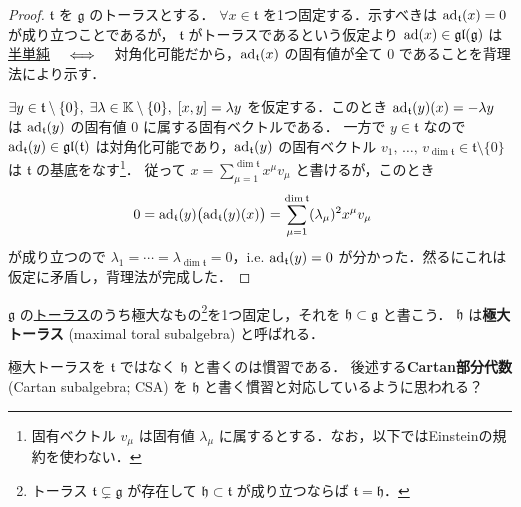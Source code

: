 \documentclass[rep_main]{subfiles}
\begin{document}
\begin{proof}
	$\mathfrak{t}$ を $\mathfrak{g}$ のトーラスとする．
	$\forall x \in \mathfrak{t}$ を1つ固定する．示すべきは $\operatorname{ad}_{\mathfrak{t}} (x) = 0$ が成り立つことであるが，
	$\mathfrak{t}$ がトーラスであるという仮定より $\operatorname{ad} (x) \in \mathfrak{gl} (\mathfrak{g})$ は\hyperref[def:semisimple-end]{半単純} $\quad \Longleftrightarrow \quad$ 対角化可能だから，$\operatorname{ad}_{\mathfrak{t}}(x)$ の固有値が全て $0$ であることを背理法により示す．

	$\exists y \in \mathfrak{t} \setminus \{0\},\; \exists \lambda \in \mathbb{K} \setminus \{0\},\; \comm{x}{y} = \lambda y$ を仮定する．このとき $\operatorname{ad}_{\mathfrak{t}}(y)(x) = -\lambda y$ は $\operatorname{ad}_{\mathfrak{t}}(y)$ の固有値 $0$ に属する固有ベクトルである．
	一方で $y \in \mathfrak{t}$ なので $\operatorname{ad}_{\mathfrak{t}}(y) \in \mathfrak{gl}(\mathfrak{t})$ は対角化可能であり，$\operatorname{ad}_{\mathfrak{t}}(y)$ の固有ベクトル $v_1,\, \dots,\, v_{\dim \mathfrak{t}} \in \mathfrak{t} \setminus \{0\}$ は $\mathfrak{t}$ の基底をなす\footnote{固有ベクトル $v_\mu$ は固有値 $\lambda_\mu$ に属するとする．なお，以下ではEinsteinの規約を使わない．}． 
	従って $x = \sum_{\mu=1}^{\dim \mathfrak{t}} x^\mu v_\mu$ と書けるが，このとき
	\begin{align}
		0 = \operatorname{ad}_{\mathfrak{t}} (y) \bigl(\operatorname{ad}_{\mathfrak{t}}(y)(x)\bigr) &= \sum_{\mu=1}^{\dim \mathfrak{t}} (\lambda_\mu)^2 x^\mu v_\mu 
	\end{align}
	が成り立つので $\lambda_1 = \cdots = \lambda_{\dim \mathfrak{t}} = 0$，i.e. $\operatorname{ad}_{\mathfrak{t}}(y) = 0$ が分かった．然るにこれは仮定に矛盾し，背理法が完成した．
\end{proof}

	

$\mathfrak{g}$ の\hyperref[def:toral-subLieAlg]{トーラス}のうち極大なもの\footnote{トーラス $\mathfrak{t} \subsetneq \mathfrak{g}$ が存在して $\mathfrak{h} \subset \mathfrak{t}$ が成り立つならば $\mathfrak{t} = \mathfrak{h}$．}を1つ固定し，それを $\mathfrak{h} \subset \mathfrak{g}$ と書こう．
$\mathfrak{h}$ は\textbf{極大トーラス} (maximal toral subalgebra) と呼ばれる．
\begin{marker}
	極大トーラスを $\mathfrak{t}$ ではなく $\mathfrak{h}$ と書くのは慣習である．
	後述する\textbf{Cartan部分代数} (Cartan subalgebra; CSA) を $\mathfrak{h}$ と書く慣習と対応しているように思われる？
\end{marker}
\end{document}
